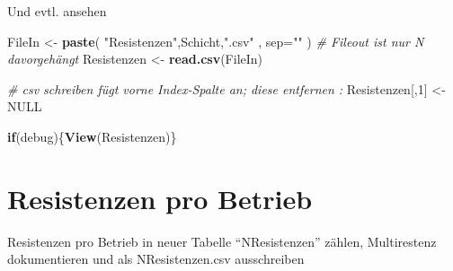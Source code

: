 \documentclass[
]{article}
\newenvironment{Shaded}{\begin{snugshade}}{\end{snugshade}}
\newcommand{\CommentTok}[1]{\textcolor[rgb]{0.56,0.35,0.01}{\textit{#1}}}
\newcommand{\ControlFlowTok}[1]{\textcolor[rgb]{0.13,0.29,0.53}{\textbf{#1}}}
\newcommand{\DataTypeTok}[1]{\textcolor[rgb]{0.13,0.29,0.53}{#1}}
\newcommand{\DecValTok}[1]{\textcolor[rgb]{0.00,0.00,0.81}{#1}}
\newcommand{\KeywordTok}[1]{\textcolor[rgb]{0.13,0.29,0.53}{\textbf{#1}}}
\newcommand{\NormalTok}[1]{#1}
\newcommand{\OtherTok}[1]{\textcolor[rgb]{0.56,0.35,0.01}{#1}}
\newcommand{\StringTok}[1]{\textcolor[rgb]{0.31,0.60,0.02}{#1}}
\begin{document}
Und evtl. ansehen

\begin{Shaded}
\begin{Highlighting}[]
\NormalTok{FileIn <-}\StringTok{ }\KeywordTok{paste}\NormalTok{( }\StringTok{"Resistenzen"}\NormalTok{,Schicht,}\StringTok{".csv"}\NormalTok{ , }\DataTypeTok{sep=}\StringTok{""}\NormalTok{ )  }\CommentTok{# Fileout ist nur N davorgehängt}
\NormalTok{Resistenzen <-}\StringTok{ }\KeywordTok{read.csv}\NormalTok{(FileIn)}

\CommentTok{# csv schreiben fügt vorne Index-Spalte an; diese entfernen :}
\NormalTok{Resistenzen[,}\DecValTok{1}\NormalTok{] <-}\StringTok{ }\OtherTok{NULL}                      

\ControlFlowTok{if}\NormalTok{(debug)\{}\KeywordTok{View}\NormalTok{(Resistenzen)\}}
\end{Highlighting}
\end{Shaded}

\hypertarget{resistenzen-pro-betrieb}{%
\section{Resistenzen pro Betrieb}\label{resistenzen-pro-betrieb}}

Resistenzen pro Betrieb in neuer Tabelle ``NResistenzen'' zählen,
Multirestenz dokumentieren und als NResistenzen.csv ausschreiben
\end{document}
